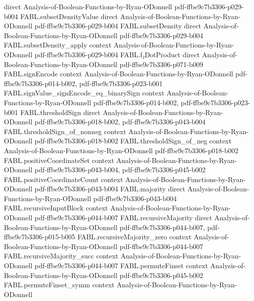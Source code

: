 \begin{theorem}
  {direct}
  {Analysis-of-Boolean-Functions-by-Ryan-ODonnell}
  {pdf-ffbe9c7b3306-p029-b004}
\proofstep
  {FABL.subsetDensityValue}
  {direct}
  {Analysis-of-Boolean-Functions-by-Ryan-ODonnell}
  {pdf-ffbe9c7b3306-p029-b004}
\proofstep
  {FABL.subsetDensity}
  {direct}
  {Analysis-of-Boolean-Functions-by-Ryan-ODonnell}
  {pdf-ffbe9c7b3306-p029-b004}
\proofstep
  {FABL.subsetDensity_apply}
  {context}
  {Analysis-of-Boolean-Functions-by-Ryan-ODonnell}
  {pdf-ffbe9c7b3306-p029-b004}
\proofstep
  {FABL.f₂DotProduct}
  {direct}
  {Analysis-of-Boolean-Functions-by-Ryan-ODonnell}
  {pdf-ffbe9c7b3306-p071-b009}
\proofstep
  {FABL.signEncode}
  {context}
  {Analysis-of-Boolean-Functions-by-Ryan-ODonnell}
  {pdf-ffbe9c7b3306-p014-b002,
    pdf-ffbe9c7b3306-p023-b001}
\proofstep
  {FABL.signValue_signEncode_eq_binarySign}
  {context}
  {Analysis-of-Boolean-Functions-by-Ryan-ODonnell}
  {pdf-ffbe9c7b3306-p014-b002,
    pdf-ffbe9c7b3306-p023-b001}
\proofstep
  {FABL.thresholdSign}
  {direct}
  {Analysis-of-Boolean-Functions-by-Ryan-ODonnell}
  {pdf-ffbe9c7b3306-p018-b002,
    pdf-ffbe9c7b3306-p043-b004}
\proofstep
  {FABL.thresholdSign_of_nonneg}
  {context}
  {Analysis-of-Boolean-Functions-by-Ryan-ODonnell}
  {pdf-ffbe9c7b3306-p018-b002}
\proofstep
  {FABL.thresholdSign_of_neg}
  {context}
  {Analysis-of-Boolean-Functions-by-Ryan-ODonnell}
  {pdf-ffbe9c7b3306-p018-b002}
\proofstep
  {FABL.positiveCoordinateSet}
  {context}
  {Analysis-of-Boolean-Functions-by-Ryan-ODonnell}
  {pdf-ffbe9c7b3306-p043-b004,
    pdf-ffbe9c7b3306-p045-b002}
\proofstep
  {FABL.positiveCoordinateCount}
  {context}
  {Analysis-of-Boolean-Functions-by-Ryan-ODonnell}
  {pdf-ffbe9c7b3306-p043-b004}
\proofstep
  {FABL.majority}
  {direct}
  {Analysis-of-Boolean-Functions-by-Ryan-ODonnell}
  {pdf-ffbe9c7b3306-p043-b004}
\proofstep
  {FABL.recursiveInputBlock}
  {context}
  {Analysis-of-Boolean-Functions-by-Ryan-ODonnell}
  {pdf-ffbe9c7b3306-p044-b007}
\proofstep
  {FABL.recursiveMajority}
  {direct}
  {Analysis-of-Boolean-Functions-by-Ryan-ODonnell}
  {pdf-ffbe9c7b3306-p044-b007,
    pdf-ffbe9c7b3306-p015-b005}
\proofstep
  {FABL.recursiveMajority_zero}
  {context}
  {Analysis-of-Boolean-Functions-by-Ryan-ODonnell}
  {pdf-ffbe9c7b3306-p044-b007}
\proofstep
  {FABL.recursiveMajority_succ}
  {context}
  {Analysis-of-Boolean-Functions-by-Ryan-ODonnell}
  {pdf-ffbe9c7b3306-p044-b007}
\proofstep
  {FABL.permuteFinset}
  {context}
  {Analysis-of-Boolean-Functions-by-Ryan-ODonnell}
  {pdf-ffbe9c7b3306-p045-b002}
\proofstep
  {FABL.permuteFinset_symm}
  {context}
  {Analysis-of-Boolean-Functions-by-Ryan-ODonnell}

\end{theorem}
